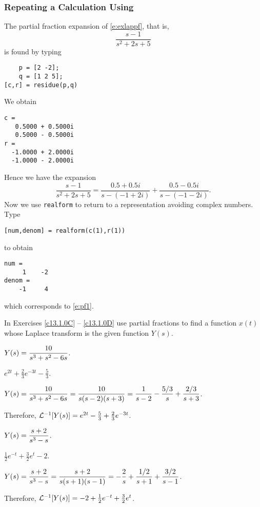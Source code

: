 \documentclass{ximera}
\begin{document}
\subsubsection*{Repeating a Calculation Using \Matlab}

The partial fraction expansion of \eqref{e:exlappf}, that is,
\[
\frac{s-1}{s^2+2s+5}
\]
is found by typing
\begin{verbatim}
    p = [2 -2];
    q = [1 2 5];
[c,r] = residue(p,q)
\end{verbatim}
We obtain
\begin{verbatim}
c =
   0.5000 + 0.5000i
   0.5000 - 0.5000i
r =
  -1.0000 + 2.0000i
  -1.0000 - 2.0000i
\end{verbatim}
Hence we have the expansion
\[
\frac{s-1}{s^2+2s+5}= \frac{0.5+0.5i}{s-(-1+2i)}+\frac{0.5-0.5i}{s-(-1-2i)}.
\]
Now we use {\tt realform} 
to return to a representation avoiding complex numbers.  Type
\begin{verbatim}
[num,denom] = realform(c(1),r(1))
\end{verbatim}
to obtain
\begin{verbatim}
num = 
     1    -2
denom = 
    -1     4
\end{verbatim}
which corresponds to \eqref{e:pf1}.

\EXER

\TEXER

\noindent In Exercises \ref{c13.1.0C} -- \ref{c13.1.0D} use partial fractions
to find a function $x(t)$ whose Laplace transform is the given function
$Y(s)$.
\begin{exercise} \label{c13.1.0C}
$Y(s) = \displaystyle\frac{10}{s^3+s^2-6s}$.

\begin{solution}
\ans $e^{2t}+\frac{2}{3}e^{-3t}-\frac{5}{3}$.

\soln $Y(s)=\displaystyle\frac{10}{s^3+s^2-6s} = \frac{10}{s(s-2)(s+3)}=
\frac{1}{s-2}-\frac{5/3}{s}+\frac{2/3}{s+3}$.  

Therefore,
${\cal L}^{-1}[Y(s)] = e^{2t}-\frac{5}{3}+\frac{2}{3}e^{-3t}$.


\end{solution}
\end{exercise}
\begin{exercise} \label{c13.1.0D}
$Y(s) = \displaystyle\frac{s+2}{s^3-s}$.

\begin{solution}
\ans $\frac{1}{2}e^{-t} + \frac{3}{2}e^t -2$.

\soln $Y(s) = \displaystyle\frac{s+2}{s^3-s} = \frac{s+2}{s(s+1)(s-1)} =
-\frac{2}{s} + \frac{1/2}{s+1} + \frac{3/2}{s-1}$.

Therefore, ${\cal L}^{-1}[Y(s)] = -2 + \frac{1}{2}e^{-t} + \frac{3}{2}e^t$.


\end{solution}
\end{exercise}
\end{document}
